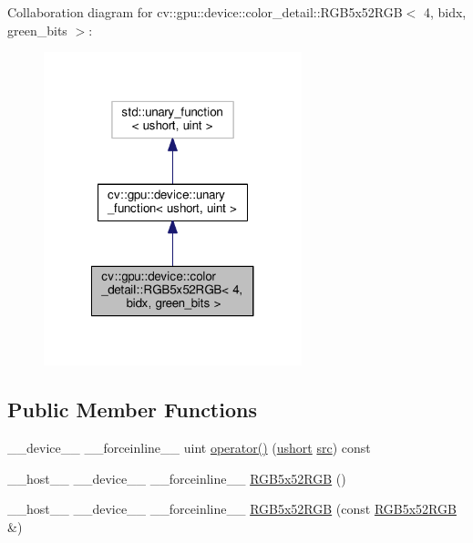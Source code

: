 Collaboration diagram for cv\-:\-:gpu\-:\-:device\-:\-:color\-\_\-detail\-:\-:R\-G\-B5x52\-R\-G\-B$<$ 4, bidx, green\-\_\-bits $>$\-:\nopagebreak
\begin{figure}[H]
\begin{center}
\leavevmode
\includegraphics[width=212pt]{structcv_1_1gpu_1_1device_1_1color__detail_1_1RGB5x52RGB_3_014_00_01bidx_00_01green__bits_01_4__coll__graph}
\end{center}
\end{figure}
\subsection*{Public Member Functions}
\begin{DoxyCompactItemize}
\item 
\-\_\-\-\_\-device\-\_\-\-\_\- \-\_\-\-\_\-forceinline\-\_\-\-\_\- uint \hyperlink{structcv_1_1gpu_1_1device_1_1color__detail_1_1RGB5x52RGB_3_014_00_01bidx_00_01green__bits_01_4_a816a5c6d39315b4e2bb585f4b2b85407}{operator()} (\hyperlink{core_2types__c_8h_ab95f123a6c9bcfee6a343170ef8c5f69}{ushort} \hyperlink{legacy_8hpp_a371cd109b74033bc4366f584edd3dacc}{src}) const 
\item 
\-\_\-\-\_\-host\-\_\-\-\_\- \-\_\-\-\_\-device\-\_\-\-\_\- \-\_\-\-\_\-forceinline\-\_\-\-\_\- \hyperlink{structcv_1_1gpu_1_1device_1_1color__detail_1_1RGB5x52RGB_3_014_00_01bidx_00_01green__bits_01_4_ae369671f9f90ca10420416691a93b798}{R\-G\-B5x52\-R\-G\-B} ()
\item 
\-\_\-\-\_\-host\-\_\-\-\_\- \-\_\-\-\_\-device\-\_\-\-\_\- \-\_\-\-\_\-forceinline\-\_\-\-\_\- \hyperlink{structcv_1_1gpu_1_1device_1_1color__detail_1_1RGB5x52RGB_3_014_00_01bidx_00_01green__bits_01_4_a912b499444c178b47a121a8f08c1b20a}{R\-G\-B5x52\-R\-G\-B} (const \hyperlink{structcv_1_1gpu_1_1device_1_1color__detail_1_1RGB5x52RGB}{R\-G\-B5x52\-R\-G\-B} \&)
\end{DoxyCompactItemize}


